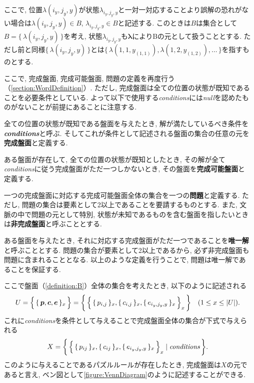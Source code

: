 ここで, 位置$\lambda(i_y,j_y,y)$が状態$\lambda_{i_y,j_y,y}$と一対一対応することより誤解の恐れがない場合は$\lambda(i_y,j_y,y) \in B  $, $\lambda_{i_y,j_y,y}\in B $と記述する.
このときは$B$は集合として$B=\{\,\lambda(i_y,j_y,y)\,\}$を考え, 状態$\lambda_{i_y,j_y,y}$も$\bm{\lambda}$によりBの元として扱うこととする.
ただし前と同様$\{\,\lambda(i_y,j_y,y)\,\}$とは$\{\,\lambda(1,1,y_{(1,1)}), \lambda(1,2,y_{(1,2)}),\ldots\,\}$を指すものとする.



ここで, 完成盤面, 完成可能盤面, 問題の定義を再度行う（\cref{section:WordDefinition}）. ただし, 完成盤面は全ての位置の状態が既知であることを必要条件としている. よって以下で使用する\textit{conditions}には\textit{null}を認めたものがないことが前提にあることに注意する.
\begin{definition}\label{definition:Conditions}
  全ての位置の状態が既知である盤面を与えたとき, 解が満たしているべき条件を\textbf{\textit{conditions}}と呼ぶ. そしてこれが条件として記述される盤面の集合の任意の元を\textbf{完成盤面}と定義する.
\end{definition}

\begin{definition}[完成可能盤面]
  ある盤面が存在して, 全ての位置の状態が既知としたとき, その解が全て\textit{conditions}に従う完成盤面がただ一つしかないとき, その盤面を\textbf{完成可能盤面}と定義する.
\end{definition}

\begin{definition}[問題]
  一つの完成盤面に対応する完成可能盤面全体の集合を一つの\textbf{問題}と定義する. ただし, 問題の集合は要素として2以上であることを要請するものとする. また, 文脈の中で問題の元として特別, 状態が未知であるものを含む盤面を指したいときは\textbf{非完成盤面}と呼ぶこととする.
\end{definition}

ある盤面を与えたとき, それに対応する完成盤面がただ一つであることを\textbf{唯一解}と呼ぶこととする. 問題の集合が要素として2以上であるから, 必ず非完成盤面も問題に含まれることとなる.
以上のような定義を行うことで, 問題は唯一解であることを保証する.

ここで盤面（\cref{definition:B}）全体の集合を考えたとき, 以下のように記述される
\begin{equation}\label{equation:U}
  U=\Bigl\{\,\{\,\bm{p},\bm{c},\bm{e}\,\}_x\,\Bigr\}=\biggl\{\,\Bigl\{\,\{\,p_{i,j}\,\}_x,\{\,c_{i,j}\,\}_x,\{\,e_{i_y,j_y,y}\,\}_x\,\Bigr\}_x\,\biggr\} \quad (1\le x \le |U|).
\end{equation}
これに\textit{conditions}を条件として与えることで完成盤面全体の集合が下式で与えられる
\begin{equation}\label{equation:X}
  X=\biggl\{\,\Bigl\{\,\{\,p_{ij}\,\}_x,\{\,c_{ij}\,\}_x,\{\,e_{i_y,j_y,y}\,\}_x\,\Bigr\}_x\mid \rm{\textit{conditions}}\,\biggr\}.
\end{equation}
このように与えることであるパズルルールが存在したとき, 完成盤面は$X$の元であると言え, ベン図として\cref{figure:VennDiagram}のように記述することができる.


